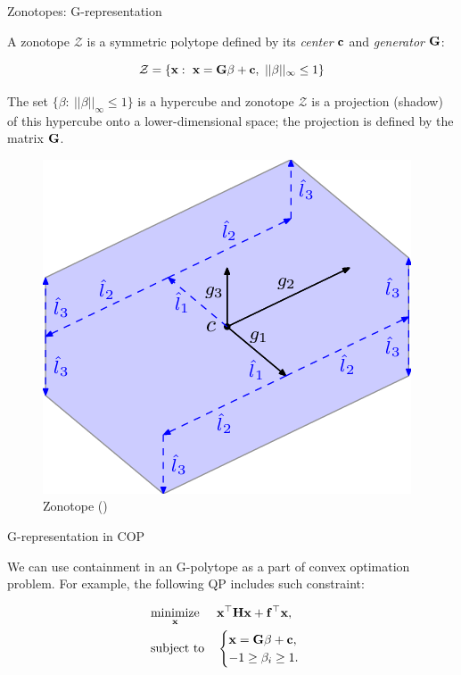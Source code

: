 \documentclass{beamer}
\begin{document}
\begin{frame}{Zonotopes: G-representation}
	\begin{flushleft}
		
		A zonotope $\mathcal{Z}$ is a symmetric polytope defined by its \emph{center} $\mathbf{c}$ and \emph{generator} $\mathbf{G}$:
		
		\begin{equation}
			\mathcal{Z} = \{ \bo{x}: \ \bo{x}=\bo{G}\beta+\bo{c}, \ ||\beta||_\infty \leq 1  \}
		\end{equation}
	
		The set $\{ \beta: \ ||\beta||_\infty \leq 1  \}$ is a hypercube and zonotope $\mathcal{Z}$ is a projection (shadow) of this hypercube onto a lower-dimensional space; the projection is defined by the matrix $\mathbf{G}$.
		
		\begin{figure}
			\centering
			\includegraphics[width=0.4\linewidth]{zonotope_example}
			\caption{Zonotope () }
			\label{fig:zonotopeexample}
		\end{figure}
		
		
	\end{flushleft}
\end{frame}




\begin{frame}{G-representation in COP}
	\begin{flushleft}
		
		We can use containment in an G-polytope as a part of convex optimation problem. For example, the following QP includes such constraint:
		
		\begin{equation}
			\begin{aligned}
				& \underset{\mathbf{x}}{\text{minimize}}
				& & \mathbf{x}^\top \mathbf{H} \mathbf{x} + \mathbf{f}^\top\mathbf{x}, \\
				& \text{subject to}
				& & \begin{cases}
					\mathbf{x} = \mathbf{G}\beta+\mathbf{c}, \\
					-1 \geq \beta_i \geq 1.
				\end{cases}
			\end{aligned}
		\end{equation}
		
	\end{flushleft}
\end{frame}
\end{document}
